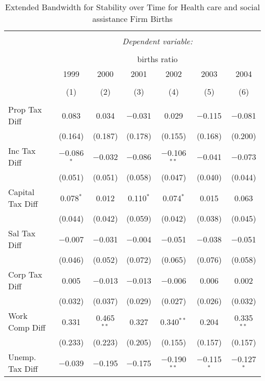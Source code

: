 
\begin{table}[!htbp] \centering 
  \caption{Extended Bandwidth for Stability over Time for  Health care and social assistance Firm Births} 
  \label{62 ebyear} 
\small 
\begin{tabular}{@{\extracolsep{5pt}}lcccccc} 
\\[-1.8ex]\hline 
\hline \\[-1.8ex] 
 & \multicolumn{6}{c}{\textit{Dependent variable:}} \\ 
\cline{2-7} 
\\[-1.8ex] & \multicolumn{6}{c}{births ratio} \\ 
 & 1999 & 2000 & 2001 & 2002 & 2003 & 2004 \\ 
\\[-1.8ex] & (1) & (2) & (3) & (4) & (5) & (6)\\ 
\hline \\[-1.8ex] 
 Prop Tax Diff & 0.083 & 0.034 & $-$0.031 & 0.029 & $-$0.115 & $-$0.081 \\ 
  & (0.164) & (0.187) & (0.178) & (0.155) & (0.168) & (0.200) \\ 
  Inc Tax Diff & $-$0.086$^{*}$ & $-$0.032 & $-$0.086 & $-$0.106$^{**}$ & $-$0.041 & $-$0.073 \\ 
  & (0.051) & (0.051) & (0.058) & (0.047) & (0.040) & (0.044) \\ 
  Capital Tax Diff & 0.078$^{*}$ & 0.012 & 0.110$^{*}$ & 0.074$^{*}$ & 0.015 & 0.063 \\ 
  & (0.044) & (0.042) & (0.059) & (0.042) & (0.038) & (0.045) \\ 
  Sal Tax Diff & $-$0.007 & $-$0.031 & $-$0.004 & $-$0.051 & $-$0.038 & $-$0.051 \\ 
  & (0.046) & (0.052) & (0.072) & (0.065) & (0.076) & (0.058) \\ 
  Corp Tax Diff & 0.005 & $-$0.013 & $-$0.013 & $-$0.006 & 0.006 & 0.002 \\ 
  & (0.032) & (0.037) & (0.029) & (0.027) & (0.026) & (0.032) \\ 
  Work Comp Diff & 0.331 & 0.465$^{**}$ & 0.327 & 0.340$^{**}$ & 0.204 & 0.335$^{**}$ \\ 
  & (0.233) & (0.223) & (0.205) & (0.155) & (0.157) & (0.157) \\ 
  Unemp. Tax Diff & $-$0.039 & $-$0.195 & $-$0.175 & $-$0.190$^{**}$ & $-$0.115$^{*}$ & $-$0.127$^{*}$ \\ 

\end{tabular}
\end{table}
